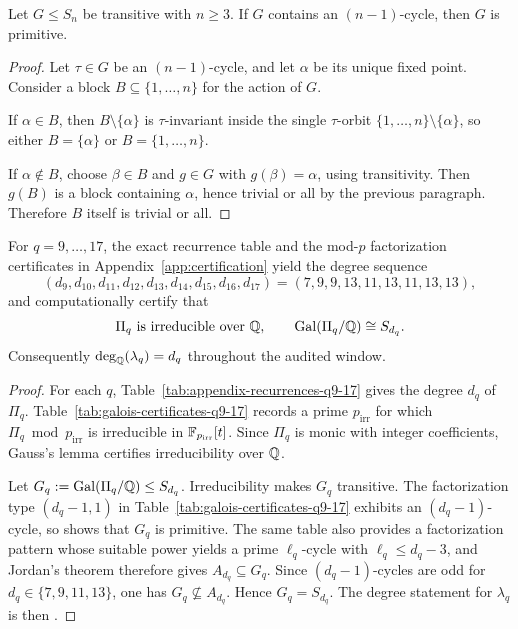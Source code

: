 \begin{lemma}
\label{lem:nminus1-cycle-primitive}
Let \(G\le S_n\) be transitive with \(n\ge 3\).  If \(G\) contains an
\((n-1)\)-cycle, then \(G\) is primitive.
\end{lemma}

\begin{proof}
Let \(\tau\in G\) be an \((n-1)\)-cycle, and let \(\alpha\) be its unique fixed
point.  Consider a block \(B\subseteq\{1,\dots,n\}\) for the action of \(G\).

If \(\alpha\in B\), then \(B\setminus\{\alpha\}\) is \(\tau\)-invariant inside the
single \(\tau\)-orbit \(\{1,\dots,n\}\setminus\{\alpha\}\), so either
\(B=\{\alpha\}\) or \(B=\{1,\dots,n\}\).

If \(\alpha\notin B\), choose \(\beta\in B\) and \(g\in G\) with \(g(\beta)=\alpha\),
using transitivity.  Then \(g(B)\) is a block containing \(\alpha\), hence
trivial or all by the previous paragraph.  Therefore \(B\) itself is trivial or
all.
\end{proof}

\begin{observation}
\label{obs:galois-window}
For \(q=9,\dots,17\), the exact recurrence table and the mod-\(p\)
factorization certificates in Appendix~\ref{app:certification} yield the degree
sequence
\[
  (d_9,d_{10},d_{11},d_{12},d_{13},d_{14},d_{15},d_{16},d_{17})
  =(7,9,9,13,11,13,11,13,13),
\]
and computationally certify that
\[
  \Pi_q \text{ is irreducible over }\mathbb{Q},
  \qquad
  \operatorname{Gal}(\Pi_q/\mathbb{Q})\cong S_{d_q}.
\]
Consequently \(\deg_{\mathbb{Q}}(\lambda_q)=d_q\) throughout the audited window.
\end{observation}

\begin{proof}
For each \(q\), Table~\ref{tab:appendix-recurrences-q9-17} gives the degree
\(d_q\) of \(\Pi_q\).  Table~\ref{tab:galois-certificates-q9-17} records a
prime \(p_{\mathrm{irr}}\) for which \(\Pi_q\bmod p_{\mathrm{irr}}\) is
irreducible in \(\mathbb{F}_{p_{\mathrm{irr}}}[t]\).  Since \(\Pi_q\) is monic with
integer coefficients, Gauss's lemma certifies irreducibility over \(\mathbb{Q}\).

Let \(G_q:=\operatorname{Gal}(\Pi_q/\mathbb{Q})\le S_{d_q}\).  Irreducibility makes \(G_q\)
transitive.  The factorization type \((d_q-1,1)\) in
Table~\ref{tab:galois-certificates-q9-17} exhibits an \((d_q-1)\)-cycle, so
 shows that \(G_q\) is primitive.  The same
table also provides a factorization pattern whose suitable power yields a prime
\(\ell_q\)-cycle with \(\ell_q\le d_q-3\), and Jordan's theorem
\cite[Thm.~3.3A]{DixonMortimer1996} therefore gives
\(A_{d_q}\subseteq G_q\).  Since \((d_q-1)\)-cycles are odd for
\(d_q\in\{7,9,11,13\}\), one has \(G_q\not\subseteq A_{d_q}\).  Hence
\(G_q=S_{d_q}\).  The degree statement for \(\lambda_q\) is then
.
\end{proof}

